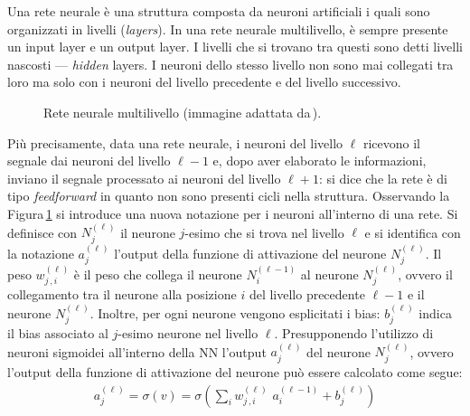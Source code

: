 Una rete neurale è una struttura composta da neuroni artificiali i quali sono organizzati in livelli (\textit{layers}). In una rete neurale multilivello, è sempre presente un input layer e un output layer. I livelli che si trovano tra questi sono detti livelli nascosti — \textit{hidden} layers. I neuroni dello stesso livello non sono mai collegati tra loro ma solo con i neuroni del livello precedente e del livello successivo.
% 
\begin{figure}[!b]
    \centering
    
    \caption[Rete neurale multilivello.]{Rete neurale multilivello (immagine adattata da\,\cite{izaak2022neural}).}\label{fig:neural-network}
\end{figure}
% 
Più precisamente, data una rete neurale, i neuroni del livello $\ell$ ricevono il segnale dai neuroni del livello $\ell-1$ e, dopo aver elaborato le informazioni, inviano il segnale processato ai neuroni del livello $\ell+1$: si dice che la rete è di tipo \textit{feedforward} in quanto non sono presenti cicli nella struttura. Osservando la Figura\,\ref{fig:neural-network} si introduce una nuova notazione per i neuroni all'interno di una rete. Si definisce con $N^{(\ell)}_j$ il neurone $j$-esimo che si trova nel livello $\ell$ e si identifica con la notazione $a^{(\ell)}_j$ l'output della funzione di attivazione del neurone $N^{(\ell)}_j$. Il peso $w^{(\ell)}_{j\,,i}$ è il peso che collega il neurone $N^{(\ell - 1)}_i$ al neurone $N^{(\ell)}_j$, ovvero il collegamento tra il neurone alla posizione $i$ del livello precedente $\ell-1$ e il neurone $N^{(\ell)}_j$. Inoltre, per ogni neurone vengono esplicitati i bias: $b^{(\ell)}_j$ indica il bias associato al $j$-esimo neurone nel livello $\ell$. Presupponendo l'utilizzo di neuroni sigmoidei all'interno della \acs{NN} l'output $a^{(\ell)}_j$ del neurone $N^{(\ell)}_j$, ovvero l'output della funzione di attivazione del neurone può essere calcolato come segue: 
% 
\begin{gather*}
     a^{(\ell)}_j = \sigma\left( v \right) = \sigma\left( \sum_i w^{(\ell)}_{j\,,i} \,\, a^{(\ell - 1)}_i + b^{(\ell)}_j \right)
\end{gather*}

